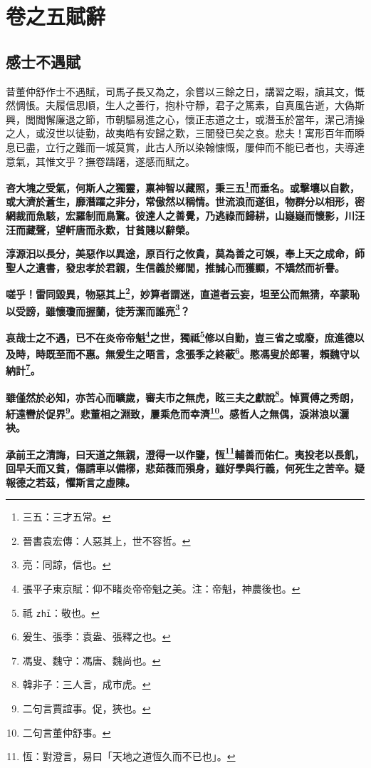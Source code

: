 \chapter{卷之五\hspace{1ex}賦辭}

\section{感士不遇賦\hspace{1ex}{\footnotesize 并序}}

\begin{quoting}昔董仲舒作士不遇賦，司馬子長又為之，余嘗以三餘之日，講習之暇，讀其文，慨然惆悵。夫履信思順，生人之善行，抱朴守靜，君子之篤素，自真風告逝，大偽斯興，閭閻懈廉退之節，市朝驅易進之心，懷正志道之士，或潛玉於當年，潔己清操之人，或沒世以徒勤，故夷皓有安歸之歎，三閭發已矣之哀。悲夫！寓形百年而瞬息已盡，立行之難而一城莫賞，此古人所以染翰慷慨，屢伸而不能已者也，夫導達意氣，其惟文乎？撫卷躊躇，遂感而賦之。\end{quoting}

\textbf{咨大塊之受氣，何斯人之獨靈，禀神智以藏照，秉三五\footnote{三五：三才五常。}而垂名。或擊壤以自歡，或大濟於蒼生，靡潛躍之非分，常傲然以稱情。世流浪而遂徂，物群分以相形，密網裁而魚駭，宏羅制而鳥驚。彼達人之善覺，乃逃祿而歸耕，山嶷嶷而懷影，川汪汪而藏聲，望軒唐而永歎，甘貧賤以辭榮。}

\textbf{淳源汩以長分，美惡作以異途，原百行之攸貴，莫為善之可娛，奉上天之成命，師聖人之遺書，發忠孝於君親，生信義於鄉閭，推誠心而獲顯，不矯然而祈譽。}

\textbf{嗟乎！雷同毀異，物惡其上\footnote{晉書袁宏傳：人惡其上，世不容哲。}，妙算者謂迷，直道者云妄，坦至公而無猜，卒蒙恥以受謗，雖懷瓊而握蘭，徒芳潔而誰亮\footnote{亮：同諒，信也。}？}

\textbf{哀哉士之不遇，已不在炎帝帝魁\footnote{張平子東京賦：仰不睹炎帝帝魁之美。注：帝魁，神農後也。}之世，獨祗\footnote{祗 \texttt{zhī}：敬也。}修以自勤，豈三省之或廢，庶進德以及時，時既至而不惠。無爰生之晤言，念張季之終蔽\footnote{爰生、張季：袁盎、張釋之也。}。愍馮叟於郎署，賴魏守以納計\footnote{馮叟、魏守：馮唐、魏尚也。}。}

\textbf{雖僅然於必知，亦苦心而曠歲，審夫市之無虎，眩三夫之獻說\footnote{韓非子：三人言，成市虎。}。悼賈傅之秀朗，紆遠轡於促界\footnote{二句言賈誼事。促，狹也。}。悲董相之淵致，屢乘危而幸濟\footnote{二句言董仲舒事。}。感哲人之無偶，淚淋浪以灑袂。}

\textbf{承前王之清誨，曰天道之無親，澄得一以作鑒，恆\footnote{恆：對澄言，易曰「天地之道恆久而不已也」。}輔善而佑仁。夷投老以長飢，回早夭而又貧，傷請車以備槨，悲茹薇而殞身，雖好學與行義，何死生之苦辛。疑報德之若茲，懼斯言之虛陳。}

